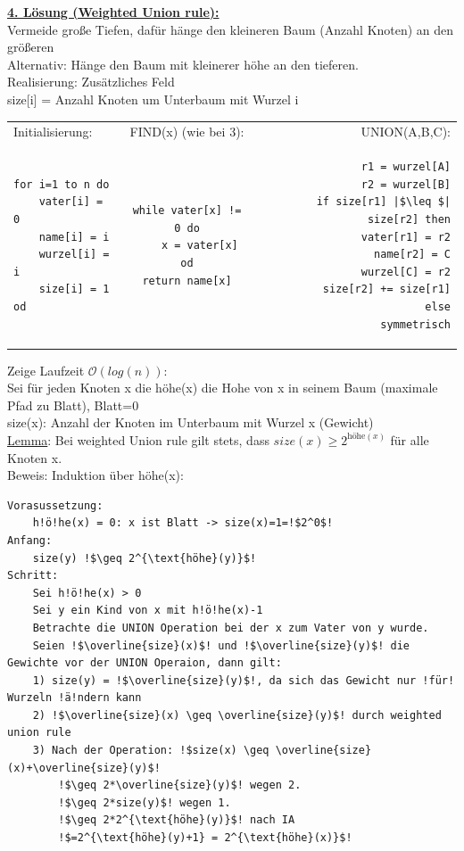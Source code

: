 \documentclass[a4paper]{article}
\newcommand{\oh}[1]{$\mathcal{O}(#1)$}
\begin{document}
\underline{\textbf{4. Lösung (Weighted Union rule):}}\\
Vermeide große Tiefen, dafür hänge den kleineren Baum (Anzahl Knoten) an den größeren\\
Alternativ: Hänge den Baum mit kleinerer höhe an den tieferen.\\
Realisierung: Zusätzliches Feld\\
size[i] = Anzahl Knoten um Unterbaum mit Wurzel i\\
\begin{tabular}{ l c r }
Initialisierung: & FIND(x) (wie bei 3): & UNION(A,B,C):\\
\begin{lstlisting}
for i=1 to n do
	vater[i] = 0
	name[i] = i
	wurzel[i] = i
	size[i] = 1
od
\end{lstlisting}
&
\begin{lstlisting}[escapechar=|]
while vater[x] != 0 do
	x = vater[x]
od
return name[x]
\end{lstlisting}&
\begin{lstlisting}[escapechar=|]
r1 = wurzel[A]
r2 = wurzel[B]
if size[r1] |$\leq $| size[r2] then
	vater[r1] = r2
	name[r2] = C
	wurzel[C] = r2
	size[r2] += size[r1]
else
	symmetrisch
\end{lstlisting}
\end{tabular}
Zeige Laufzeit \oh{log(n)}:\\
Sei für jeden Knoten x die höhe(x) die Hohe von x in seinem Baum (maximale Pfad zu Blatt), Blatt=0\\
size(x): Anzahl der Knoten im Unterbaum mit Wurzel x (Gewicht)\\
\underline{Lemma}: Bei weighted Union rule gilt stets, dass $size(x)\geq 2^{\text{höhe}(x)}$ für alle Knoten x.\\
Beweis: Induktion über höhe(x):\\
\begin{lstlisting}[escapechar=!]
Vorasussetzung:
	h!ö!he(x) = 0: x ist Blatt -> size(x)=1=!$2^0$!
Anfang:
	size(y) !$\geq 2^{\text{höhe}(y)}$!
Schritt:
	Sei h!ö!he(x) > 0
	Sei y ein Kind von x mit h!ö!he(x)-1
	Betrachte die UNION Operation bei der x zum Vater von y wurde.
	Seien !$\overline{size}(x)$! und !$\overline{size}(y)$! die Gewichte vor der UNION Operaion, dann gilt:
	1) size(y) = !$\overline{size}(y)$!, da sich das Gewicht nur !für! Wurzeln !ä!ndern kann
	2) !$\overline{size}(x) \geq \overline{size}(y)$! durch weighted union rule
	3) Nach der Operation: !$size(x) \geq \overline{size}(x)+\overline{size}(y)$!
		!$\geq 2*\overline{size}(y)$! wegen 2.
		!$\geq 2*size(y)$! wegen 1.
		!$\geq 2*2^{\text{höhe}(y)}$! nach IA
		!$=2^{\text{höhe}(y)+1} = 2^{\text{höhe}(x)}$!
\end{lstlisting}
\end{document}
